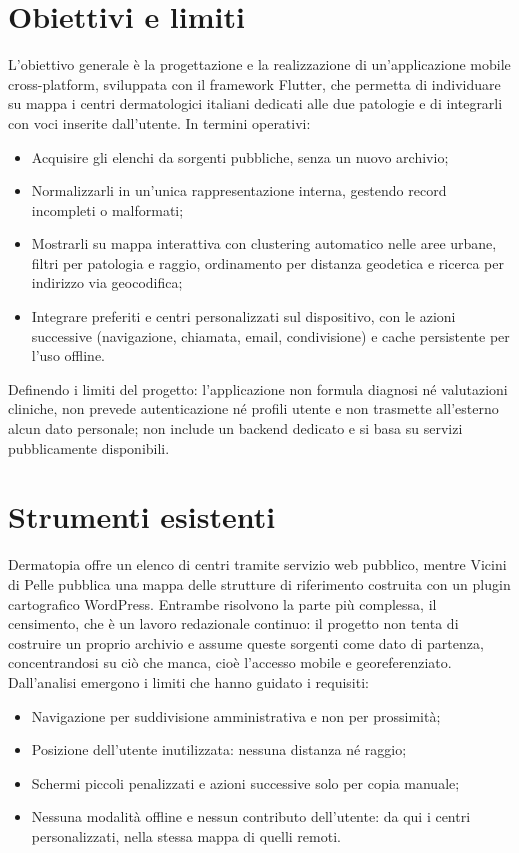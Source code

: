 \documentclass[a4paper, oneside, openright]{book}
\begin{document}
\section{Obiettivi e limiti}\label{sec:sintesi-obiettivi}

L'obiettivo generale \`e la progettazione e la realizzazione di
un'applicazione mobile cross-platform, sviluppata con il framework Flutter,
che permetta di individuare su mappa i centri dermatologici italiani
dedicati alle due patologie e di integrarli con voci inserite dall'utente.
In termini operativi:
\begin{itemize}[itemsep=2pt]
  \item Acquisire gli elenchi da sorgenti pubbliche, senza un nuovo
  archivio;
  \item Normalizzarli in un'unica rappresentazione interna, gestendo record
  incompleti o malformati;
  \item Mostrarli su mappa interattiva con clustering automatico nelle aree
  urbane, filtri per patologia e raggio, ordinamento per distanza geodetica
  e ricerca per indirizzo via geocodifica;
  \item Integrare preferiti e centri personalizzati sul dispositivo, con le azioni
  successive (navigazione, chiamata, email, condivisione) e cache
  persistente per l'uso offline.
\end{itemize}
Definendo i limiti del progetto: l'applicazione non formula diagnosi n\'e
valutazioni cliniche, non prevede autenticazione n\'e profili utente e non
trasmette all'esterno alcun dato personale; non include un backend dedicato
e si basa su servizi pubblicamente disponibili.

\section{Strumenti esistenti}\label{sec:sintesi-limiti}

Dermatopia offre un elenco di centri tramite servizio web pubblico, mentre
Vicini di Pelle pubblica una mappa delle strutture di riferimento costruita
con un plugin cartografico WordPress.
Entrambe risolvono la parte pi\`u complessa, il censimento, che \`e un
lavoro redazionale continuo: il progetto non tenta di costruire un proprio
archivio e assume queste sorgenti come dato di partenza, concentrandosi su
ci\`o che manca, cio\`e l'accesso mobile e georeferenziato.
Dall'analisi emergono i limiti che hanno guidato i requisiti:
\begin{itemize}[itemsep=2pt]
  \item Navigazione per suddivisione amministrativa e non per prossimit\`a;
  \item Posizione dell'utente inutilizzata: nessuna distanza n\'e raggio;
  \item Schermi piccoli penalizzati e azioni successive solo per copia
  manuale;
  \item Nessuna modalit\`a offline e nessun contributo dell'utente: da qui i
  centri personalizzati, nella stessa mappa di quelli remoti.
\end{itemize}
\end{document}
